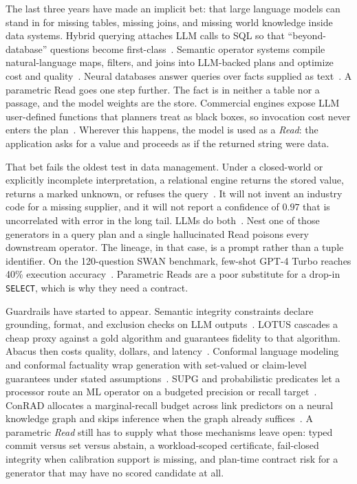 \documentclass[sigconf, nonacm]{acmart}
\begin{document}
The last three years have made an implicit bet: that large language models can stand in for missing tables, missing joins, and missing world knowledge inside data systems. Hybrid querying attaches LLM calls to SQL so that ``beyond-database'' questions become first-class~\cite{zhao2025swan,saeed2023galois}. Semantic operator systems compile natural-language maps, filters, and joins into LLM-backed plans and optimize cost and quality~\cite{patel2025lotus,liu2025palimpzest,russo2026abacus,shankar2025docetl}. Neural databases answer queries over facts supplied as text~\cite{thorpe2021neuraldb}. A parametric Read goes one step further. The fact is in neither a table nor a passage, and the model weights are the store. Commercial engines expose LLM user-defined functions that planners treat as black boxes, so invocation cost never enters the plan~\cite{an2025aidb}. Wherever this happens, the model is used as a \emph{Read}: the application asks for a value and proceeds as if the returned string were data.

That bet fails the oldest test in data management. Under a closed-world or explicitly incomplete interpretation, a relational engine returns the stored value, returns a marked unknown, or refuses the query~\cite{imielinski1984incomplete,abiteboul1991update,dalvi2007efficient,suciu2011probabilistic,widom2005trio}. It will not invent an industry code for a missing supplier, and it will not report a confidence of $0.97$ that is uncorrelated with error in the long tail. LLMs do both~\cite{guo2017calibration,kadavath2022language,kalai2024calibrated}. Nest one of those generators in a query plan and a single hallucinated Read poisons every downstream operator. The lineage, in that case, is a prompt rather than a tuple identifier. On the 120-question SWAN benchmark, few-shot GPT-4 Turbo reaches 40\% execution accuracy~\cite{zhao2025swan}. Parametric Reads are a poor substitute for a drop-in \texttt{SELECT}, which is why they need a contract.

Guardrails have started to appear. Semantic integrity constraints declare grounding, format, and exclusion checks on LLM outputs~\cite{lee2025sic}. LOTUS cascades a cheap proxy against a gold algorithm and guarantees fidelity to that algorithm. Abacus then costs quality, dollars, and latency~\cite{patel2025lotus,russo2026abacus}. Conformal language modeling and conformal factuality wrap generation with set-valued or claim-level guarantees under stated assumptions~\cite{quach2024conformal,mohri2024language,wang2024conu}. SUPG and probabilistic predicates let a processor route an ML operator on a budgeted precision or recall target~\cite{kang2020supg,lu2018probabilistic}. ConRAD allocates a marginal-recall budget across link predictors on a neural knowledge graph and skips inference when the graph already suffices~\cite{horchidan2026conrad}. A parametric \emph{Read} still has to supply what those mechanisms leave open: typed commit versus set versus abstain, a workload-scoped certificate, fail-closed integrity when calibration support is missing, and plan-time contract risk for a generator that may have no scored candidate at all.
\end{document}
